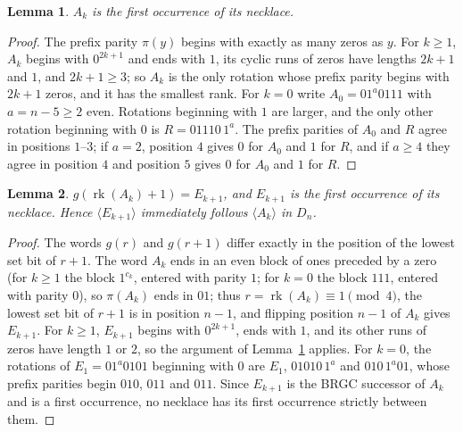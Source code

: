 \documentclass[11pt]{article}
\newtheorem{lemma}{Lemma}
\newcommand{\rk}{\operatorname{rk}}
\begin{document}
\begin{lemma}\label{lem:first}
$A_k$ is the first occurrence of its necklace.
\end{lemma}
\begin{proof}
The prefix parity $\pi(y)$ begins with exactly as many zeros as $y$. For $k\ge1$, $A_k$ begins with $0^{2k+1}$ and
ends with $1$, its cyclic runs of zeros have lengths $2k+1$ and $1$, and $2k+1\ge3$; so $A_k$ is the only rotation
whose prefix parity begins with $2k+1$ zeros, and it has the smallest rank. For $k=0$ write $A_0=01^a0111$ with
$a=n-5\ge2$ even. Rotations beginning with $1$ are larger, and the only other rotation beginning with $0$ is
$R=01110\,1^a$. The prefix parities of $A_0$ and $R$ agree in positions $1$--$3$; if $a=2$, position $4$ gives $0$
for $A_0$ and $1$ for $R$, and if $a\ge4$ they agree in position $4$ and position $5$ gives $0$ for $A_0$ and $1$
for $R$.
\end{proof}

\begin{lemma}\label{lem:succ}
$g(\rk(A_k)+1)=E_{k+1}$, and $E_{k+1}$ is the first occurrence of its necklace. Hence $\langle E_{k+1}\rangle$
immediately follows $\langle A_k\rangle$ in $D_n$.
\end{lemma}
\begin{proof}
The words $g(r)$ and $g(r+1)$ differ exactly in the position of the lowest set bit of $r+1$. The word $A_k$ ends in
an even block of ones preceded by a zero (for $k\ge1$ the block $1^{c_k}$, entered with parity $1$; for $k=0$ the
block $111$, entered with parity $0$), so $\pi(A_k)$ ends in $01$; thus $r=\rk(A_k)\equiv1\pmod4$, the lowest set bit
of $r+1$ is in position $n-1$, and flipping position $n-1$ of $A_k$ gives $E_{k+1}$. For $k\ge1$, $E_{k+1}$ begins
with $0^{2k+1}$, ends with $1$, and its other runs of zeros have length $1$ or $2$, so the argument of
Lemma~\ref{lem:first} applies. For $k=0$, the rotations of $E_1=01^a0101$ beginning with $0$ are $E_1$, $01010\,1^a$
and $010\,1^a01$, whose prefix parities begin $010$, $011$ and $011$. Since $E_{k+1}$ is the BRGC successor of $A_k$
and is a first occurrence, no necklace has its first occurrence strictly between them.
\end{proof}
\end{document}
